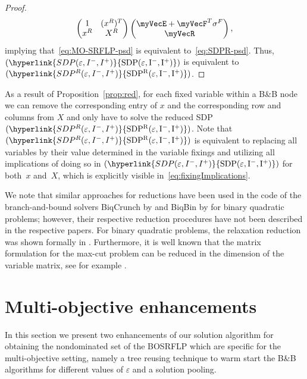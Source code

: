 \documentclass{article}
\newcommand{\myrefmath}[1]{(\hyperlink{#1}{\mathrm{#1}})}
\newcommand{\BB}{B\&B\xspace}
\newcommand{\BOSRFLP}{BOSRFLP\xspace}
\begin{document}
\begin{proof}
\begin{align*}
    \begin{pmatrix}
        1 & (x^R)^T \\
        x^R & X^R \\
    \end{pmatrix} 
    \begin{pmatrix} \myVecE + \myVecF^T \sigma^F \\ \myVecR \end{pmatrix},
\end{align*}
\endgroup
implying that~\eqref{eq:MO-SRFLP-psd} is equivalent to~\eqref{eq:SDPR-psd}. Thus, $\myrefmath{SDP(\varepsilon,I^-,I^+)}$ is equivalent to $\myrefmath{SDP^R(\varepsilon,I^-,I^+)}$.
\end{proof}

As a result of Proposition~\ref{prop:red}, for each fixed variable within a \BB node we can remove the corresponding entry of $x$ and the corresponding row and columns from $X$ and only have to solve the reduced SDP $\myrefmath{SDP^R(\varepsilon,I^-,I^+)}$.
Note that $\myrefmath{SDP^R(\varepsilon,I^-,I^+)}$ is equivalent to replacing all variables by their value determined in the variable fixings and utilizing all implications of doing so in $\myrefmath{SDP(\varepsilon,I^-,I^+)}$ for both~$x$ and~$X$, which is explicitly visible in~\eqref{eq:fixingImplications}.

We note that similar approaches for reductions have been used in the code of the branch-and-bound solvers BiqCrunch by \citet{BiqCrunch} and BiqBin by \citet{BiqBin2022} for binary quadratic problems; however, their respective reduction procedures have not been described in the respective papers. For binary quadratic problems, the relaxation reduction was shown formally in \citet{Buchheim2012}. Furthermore, it is well known that the matrix formulation for the max-cut problem can be reduced in the dimension of the variable matrix, see for example \citet{Helmberg1998}. %

\section{Multi-objective enhancements}\label{sec:MO-Enhance}
In this section we present two enhancements of our solution algorithm for obtaining the nondominated set of the \BOSRFLP which are specific for the multi-objective setting, namely a tree reusing technique to warm start the \BB algorithms for different values of $\varepsilon$ and a solution pooling.
\end{document}
